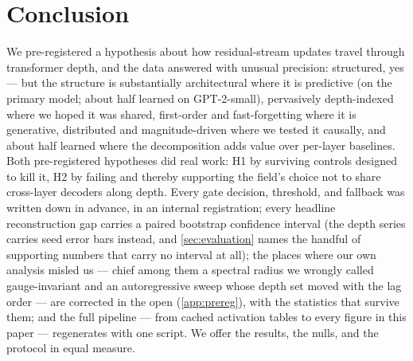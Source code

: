 \section{Conclusion}
\label{sec:conclusion}

We pre-registered a hypothesis about how residual-stream updates travel
through transformer depth, and the data answered with unusual precision:
structured, yes --- but the structure is substantially architectural where it
is predictive (on the primary model; about half learned on GPT-2-small),
pervasively depth-indexed where we hoped it was shared,
first-order and fast-forgetting where it is generative, distributed and
magnitude-driven where we tested it causally, and about half learned
where the decomposition adds value over per-layer baselines. Both
pre-registered hypotheses did real work: H1 by surviving controls designed to
kill it, H2 by failing and thereby supporting the field's choice not to share
cross-layer decoders along depth. Every gate decision, threshold, and
fallback was written down in advance, in an internal registration; every
headline reconstruction gap carries
a paired bootstrap confidence interval (the depth series carries seed error bars
instead, and \cref{sec:evaluation} names the handful of supporting numbers that
carry no interval at all); the places where our own analysis misled us ---
chief among them a spectral radius we wrongly called gauge-invariant and an
autoregressive sweep whose depth set moved with the lag order --- are
corrected in the open (\cref{app:prereg}), with
the statistics that survive them; and the full pipeline --- from cached
activation tables
to every figure in this paper --- regenerates with one script. We offer the
results, the nulls, and the protocol in equal measure.
